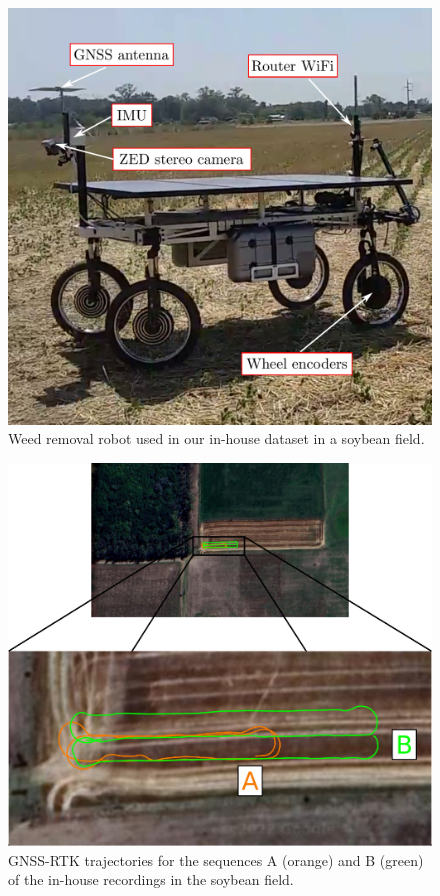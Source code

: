 \begin{figure}[t]
    \centering
    \includegraphics[width=\columnwidth]{images/robot_2022.pdf}
    \caption{Weed removal robot used in our in-house dataset in a soybean field.}
    \label{fig:robot}
\end{figure}

\begin{figure}[t]
    \centering
    \includegraphics[width=\columnwidth]{images/satellital.png}
    \caption{GNSS-RTK trajectories for the sequences A (orange) and B (green) of the in-house recordings in the soybean field.}
    \label{fig:satellital}
\end{figure}

